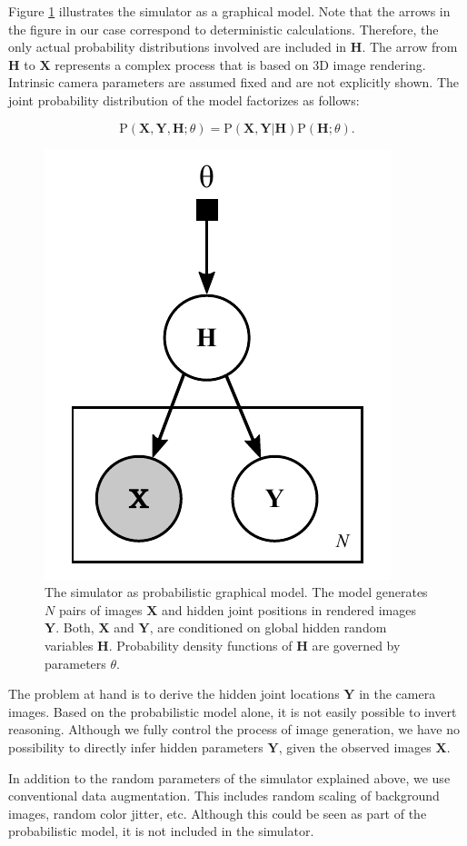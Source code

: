 \documentclass[conference]{IEEEtran}
\begin{document}
    Figure \ref{fig:probModel} illustrates the simulator as a graphical model. Note that the arrows in the figure in our case correspond to deterministic calculations. Therefore, the only actual probability distributions involved are included in $\mathbf{H}$. The arrow from $\mathbf{H}$ to $\mathbf{X}$ represents a complex process that is based on 3D image rendering. Intrinsic camera parameters are assumed fixed and are not explicitly shown. The joint probability distribution of the model factorizes as follows:
    
    \begin{equation*}
    \mathrm{P}(\mathbf{X}, \mathbf{Y}, \mathbf{H}; \theta) = \mathrm{P}(\mathbf{X}, \mathbf{Y} | \mathbf{H}) \mathrm{P}(\mathbf{H}; \theta).
    \end{equation*}

    \begin{figure}[htbp]
        \centerline{\includegraphics[width=0.33\columnwidth]{figures/probModel/probModel.pdf}}
        \caption{\label{fig:probModel} The simulator as probabilistic graphical model. The model generates $N$ pairs of images $\mathbf{X}$ and hidden joint positions in rendered images $\mathbf{Y}$. Both, $\mathbf{X}$ and $\mathbf{Y}$, are conditioned on global hidden random variables $\mathbf{H}$. Probability density functions of $\mathbf{H}$ are governed by parameters $\theta$.}
    \end{figure}

    The problem at hand is to derive the hidden joint locations $\mathbf{Y}$ in the camera images. Based on the probabilistic model alone, it is not easily possible to invert reasoning. Although we fully control the process of image generation, we have no possibility to directly infer hidden parameters $\mathbf{Y}$, given the observed images $\mathbf{X}$. 
    
    In addition to the random parameters of the simulator explained above, we use conventional data augmentation. This includes random scaling of background images, random color jitter, etc. Although this could be seen as part of the probabilistic model, it is not included in the simulator. 
    
\end{document}

